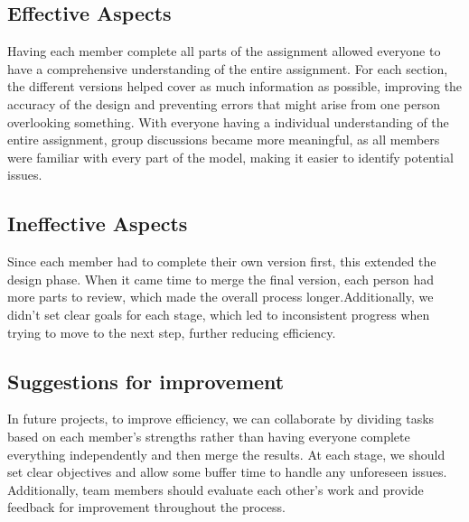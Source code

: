 \documentclass[a4paper,12pt]{article}
\begin{document}
\subsection*{Effective Aspects}

Having each member complete all parts of the assignment allowed everyone to have a comprehensive understanding of the entire assignment. For each section, the different versions helped cover as much information as possible, improving the accuracy of the design and preventing errors that might arise from one person overlooking something. With everyone having a individual understanding of the entire assignment, group discussions became more meaningful, as all members were familiar with every part of the model, making it easier to identify potential issues.

\subsection*{Ineffective Aspects}

Since each member had to complete their own version first, this extended the design phase. When it came time to merge the final version, each person had more parts to review, which made the overall process longer.Additionally, we didn’t set clear goals for each stage, which led to inconsistent progress when trying to move to the next step, further reducing efficiency.

\subsection*{Suggestions for improvement}

In future projects, to improve efficiency, we can collaborate by dividing tasks based on each member's strengths rather than having everyone complete everything independently and then merge the results. At each stage, we should set clear objectives and allow some buffer time to handle any unforeseen issues. Additionally, team members should evaluate each other’s work and provide feedback for improvement throughout the process.
\end{document}
